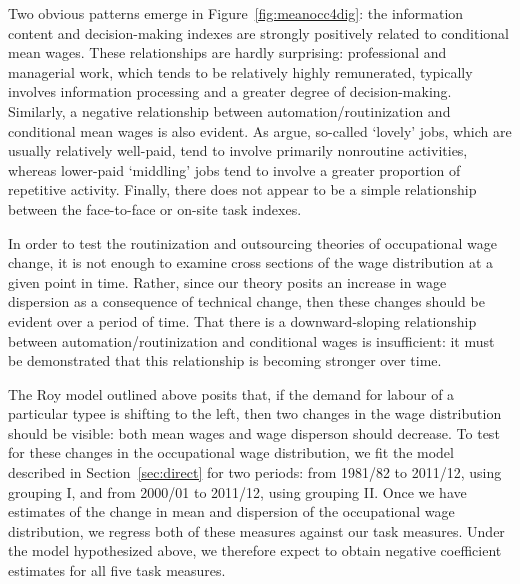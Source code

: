 Two obvious patterns emerge in Figure~\ref{fig:meanocc4dig}: the information content and decision-making indexes are strongly positively related to conditional mean wages. These relationships are hardly surprising: professional and managerial work, which tends to be relatively highly remunerated, typically involves information processing and a greater degree of decision-making. Similarly, a negative relationship between automation/routinization and conditional mean wages is also evident. As \citet{Goos2009} argue, so-called `lovely' jobs, which are usually relatively well-paid, tend to involve primarily nonroutine activities, whereas lower-paid `middling' jobs tend to involve a greater proportion of repetitive activity. Finally, there does not appear to be a simple relationship between the face-to-face or on-site task indexes.

In order to test the routinization and outsourcing theories of occupational wage change, it is not enough to examine cross sections of the wage distribution at a given point in time. Rather, since our theory posits an increase in wage dispersion as a consequence of technical change, then these changes should be evident over a period of time. That there is a downward-sloping relationship between automation/routinization and conditional wages is insufficient: it must be demonstrated that this relationship is becoming stronger over time.

The Roy model outlined above posits that, if the demand for labour of a particular typee is shifting to the left, then two changes in the wage distribution should be visible: both mean wages and wage disperson should decrease. To test for these changes in the occupational wage distribution, we fit the model described in Section~\ref{sec:direct} for two periods: from 1981/82 to 2011/12, using grouping I, and from 2000/01 to 2011/12, using grouping II. Once we have estimates of the change in mean and dispersion of the occupational wage distribution, we regress both of these measures against our task measures. Under the model hypothesized above, we therefore expect to obtain negative coefficient estimates for all five task measures.

